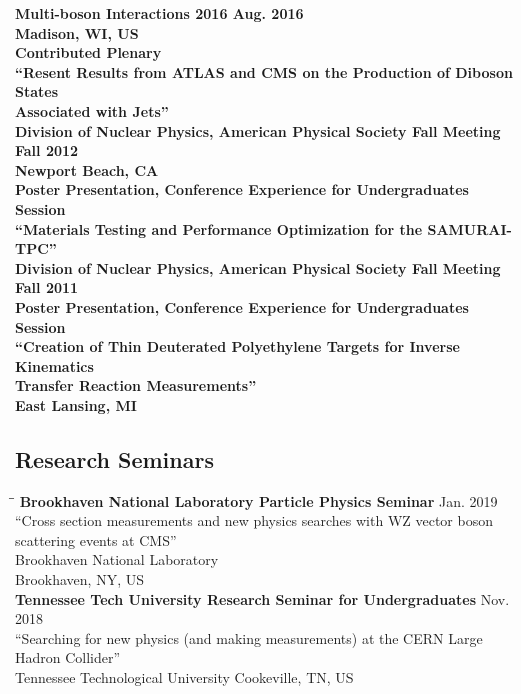 \documentclass[10pt]{res} %
\begin{document}
\begin{resume}
\begin{tabbing}
\bf{Multi-boson Interactions 2016} 		 \> \>	    Aug. 2016 \\
Madison, WI, US \\
Contributed Plenary \\ 
``Resent Results from ATLAS and CMS on the Production of Diboson States \\Associated with Jets'' \\
\bf{Division of Nuclear Physics, American Physical Society Fall Meeting} 		 \> \>	    Fall 2012 \\
Newport Beach, CA \\
Poster Presentation, Conference Experience for Undergraduates Session\\ 
``Materials Testing and Performance Optimization for the SAMURAI-TPC'' \\
\bf{Division of Nuclear Physics, American Physical Society Fall Meeting} 		 \> \>	    Fall 2011 \\
Poster Presentation, Conference Experience for Undergraduates Session\\ 
``Creation of Thin Deuterated Polyethylene Targets for Inverse Kinematics \\Transfer Reaction Measurements'' \\
East Lansing, MI 
\end{tabbing}

\vspace{-0.3in}
\subsection{Research Seminars}
\vspace{-0.1in}
\begin{tabbing}
\hspace{2.3in}\= \hspace{2.6in}\= \kill %
\textbf{Brookhaven National Laboratory Particle Physics Seminar} \>\> Jan. 2019\\ 
``Cross section measurements and new physics searches with WZ vector boson scattering events at CMS'' \\
Brookhaven National Laboratory \\
Brookhaven, NY, US \\
\textbf{Tennessee Tech University Research Seminar for Undergraduates} \>\> Nov. 2018\\ 
``Searching for new physics (and making measurements) at the CERN Large Hadron Collider'' \\
Tennessee Technological University
Cookeville, TN, US \\
\end{tabbing}


\end{resume}
\end{document}
